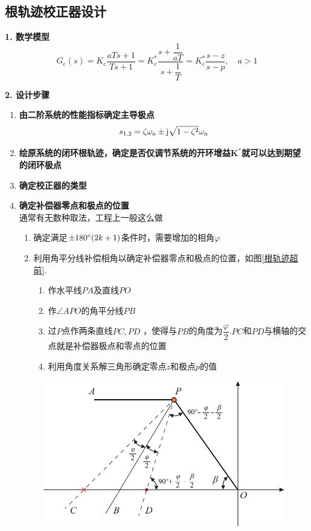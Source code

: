 \subsection{根轨迹校正器设计}

\noindent \textbf{1. 数学模型}
\begin{equation}
	G_{\text{c}}(s) = K_\text{c} \dfrac{aTs+1}{Ts + 1} = K_\text{c}^* \dfrac{s + \dfrac{1}{aT}}{s + \dfrac{1}{T}} = K_\text{c}^* \dfrac{s - z}{s - p}, \quad a>1
\end{equation}

\noindent \textbf{2. 设计步骤}
\begin{enumerate}
	\item \textbf{由二阶系统的性能指标确定主导极点}
	\begin{equation}
		s_{1,2} = \zeta \omega_{{\rm{n}}} \pm \text{j} \sqrt{1 - \zeta^2} \omega_{{\rm{n}}}
	\end{equation}
	\item \textbf{绘原系统的闭环根轨迹，确定是否仅调节系统的开环增益$\bm{K^*}$就可以达到期望的闭环极点}
	\item \textbf{确定校正器的类型}
	\item \textbf{确定补偿器零点和极点的位置}\\
	通常有无数种取法，工程上一般这么做\vspace*{-0.5em}
	\begin{enumerate}[\hspace*{1em}1.]
		\item 确定满足$\pm180{}^{\circ}(2k+1)$条件时，需要增加的相角$\varphi$
		\item 利用角平分线补偿相角以确定补偿器零点和极点的位置，如图\ref{根轨迹超前}.
		\begin{enumerate}[(1)  ]
			\item 作水平线$PA$及直线$PO$
			\item 作$\angle APO$的角平分线$PB$
			\item 过$P$点作两条直线$PC,PD$ ，使得与$PB$的角度为$\dfrac{\varphi}{2}$.$PC$和$PD$与横轴的交点就是补偿器极点和零点的位置
			\item 利用角度关系解三角形确定零点$z$和极点$p$的值
		\end{enumerate}
	\end{enumerate}
	\begin{figure}[!htb]
		\centering
		\includegraphics[width=0.55\linewidth]{pic/根轨迹超前.pdf}

\end{figure}
\end{enumerate}
